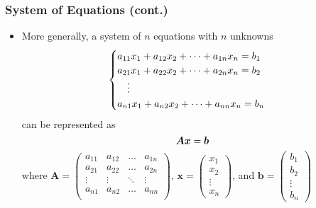 \documentclass[pdflatex, 12pt]{beamer}
\begin{document}
\begin{frame}
\frametitle{System of Equations (cont.)}
\begin{itemize}
\item More generally, a system of $n$ equations with $n$ unknowns 
 {\small
 \begin{eqnarray}
 \begin{cases}
 a_{11} x_1  + a_{12} x_2 + \cdots + a_{1n} x_n = b_1 \\
 a_{21} x_1  + a_{22} x_2 + \cdots + a_{2n} x_n = b_2 \\
 \ \ \ \vdots \\
 a_{n1} x_1  + a_{n2} x_2 + \cdots + a_{nn} x_n = b_n \notag
 \end{cases}
 \end{eqnarray}
 }
can be represented as 
 \begin{equation}
 \bm{Ax} = \bm{b} \notag 
 \end{equation}
where {\small $\bm{A} = \begin{pmatrix}
a_{11} & a_{12} & \ldots & a_{1n} \\
a_{21} & a_{22} & \ldots & a_{2n} \\
\vdots & \vdots & \ddots & \vdots \\
a_{n1} & a_{n2} & \ldots & a_{nn} \\
\end{pmatrix}$}, {\small $\bm{x} = \begin{pmatrix}
x_1 \\
x_2 \\
\vdots \\
x_n
\end{pmatrix}$}, and {\small $\bm{b} = \begin{pmatrix}
b_1 \\
b_2 \\
\vdots \\
b_n
\end{pmatrix}$}
\end{itemize}
\end{frame}
\end{document}
